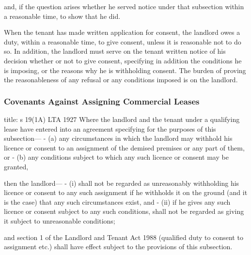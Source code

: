 \documentclass[
]{article}
\newenvironment{Shaded}{}{}
\newcommand{\NormalTok}[1]{#1}
\begin{document}
\begin{Shaded}
\begin{Highlighting}[]
\NormalTok{and, if the question arises whether he served notice under that subsection within a reasonable time, to show that he did.}
\end{Highlighting}
\end{Shaded}

\begin{Shaded}
\begin{Highlighting}[]
\NormalTok{When the tenant has made written application for consent, the landlord owes a duty, within a reasonable time, to give consent, unless it is reasonable not to do so. In addition, the landlord must serve on the tenant written notice of his decision whether or not to give consent, specifying in addition the conditions he is imposing, or the reasons why he is withholding consent. The burden of proving the reasonableness of any refusal or any conditions imposed is on the landlord.}
\end{Highlighting}
\end{Shaded}

\hypertarget{covenants-against-assigning-commercial-leases}{%
\subsubsection{Covenants Against Assigning Commercial
Leases}\label{covenants-against-assigning-commercial-leases}}

\begin{Shaded}
\begin{Highlighting}[]
\NormalTok{title: s 19(1A) LTA 1927}
\NormalTok{Where the landlord and the tenant under a qualifying lease have entered into an agreement specifying for the purposes of this subsection—}
\NormalTok{{-} (a) any circumstances in which the landlord may withhold his licence or consent to an assignment of the demised premises or any part of them, or}
\NormalTok{{-} (b) any conditions subject to which any such licence or consent may be granted,}

\NormalTok{then the landlord—}
\NormalTok{{-} (i) shall not be regarded as unreasonably withholding his licence or consent to any such assignment if he withholds it on the ground (and it is the case) that any such circumstances exist, and}
\NormalTok{{-} (ii) if he gives any such licence or consent subject to any such conditions, shall not be regarded as giving it subject to unreasonable conditions;}

\NormalTok{and section 1 of the Landlord and Tenant Act 1988 (qualified duty to consent to assignment etc.) shall have effect subject to the provisions of this subsection.}
\end{Highlighting}
\end{Shaded}
\end{document}
